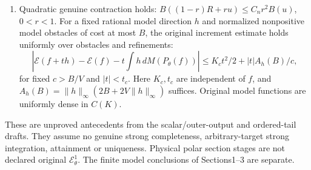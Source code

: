 \documentclass[11pt]{article}
\newcommand{\EE}{\mathcal E^1_\theta}
\begin{document}
\begin{enumerate}
constant invariance and algebraic nullness. At a model envelope it is
the finite divisorial derivative of $\mathscr E(f)=E(P_\theta(f))$.
Canonical majorants have $M(u_i)\to M(u)$ weakly. Every actual test
has finite relative integrals at outputs. For each fixed normalized
$v\in\EE$ and cost bound $B$, its majorants satisfy
\[
 \sup_{B(w)\leq B}\int(v_i-v)\,dM(w)\longrightarrow0.       \tag{9}
\]
Also there are nonnegative $a_\epsilon\in C(K)$, zero on $Z$ and
below $b_v=R-v$ off $Z$, with
\[
 \sup_{B(w)\leq B}\int|b_v-a_\epsilon|\,dM(w)<\epsilon.     \tag{10}
\]
These are the conditional ordered-gap and fixed-collar conclusions of
the completed partial paper. They do not include strong integration
against an arbitrary prescribed target.
\item Quadratic genuine contraction holds:
$B((1-r)R+ru)\leq C_nr^2B(u)$, $0<r<1$.
For a fixed rational model direction $h$ and normalized nonpositive
model obstacles of cost at most $B$, the original increment estimate
holds uniformly over obstacles and refinements:
\[
 \left|\mathscr E(f+th)-\mathscr E(f)-t\int h\,dM(P_\theta(f))\right|
 \leq K_ct^2/2+|t|A_h(B)/c,                               \tag{11}
\]
for fixed $c>B/V$ and $|t|<t_c$. Here $K_c,t_c$ are independent
of $f$, and $A_h(B)=\|h\|_\infty(2B+2V\|h\|_\infty)$ suffices.
Original model functions are uniformly dense in $C(K)$.
\end{enumerate}
These are unproved antecedents from the scalar/outer-output and
ordered-tail drafts. They assume no genuine strong completeness,
arbitrary-target strong integration, attainment or uniqueness.
Physical polar section stages are not declared original $\EE$.
The finite model conclusions of Sections1--3 are separate.
\end{document}
